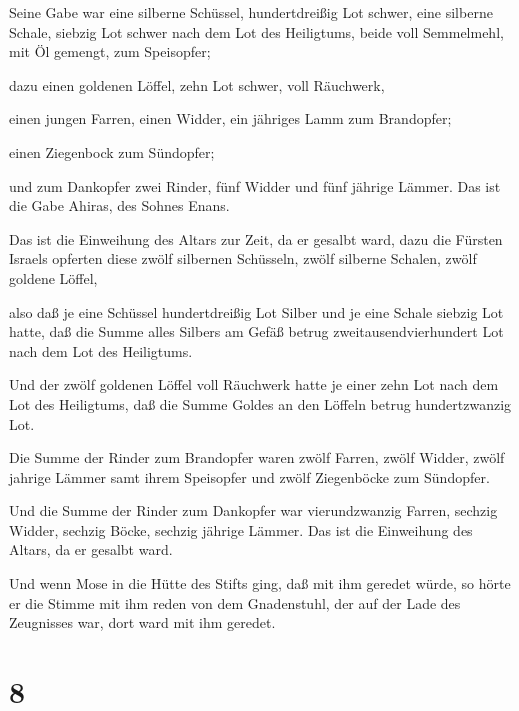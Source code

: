  Seine Gabe war eine silberne Schüssel, hundertdreißig Lot
schwer, eine silberne Schale, siebzig Lot schwer nach dem Lot des
Heiligtums, beide voll Semmelmehl, mit Öl gemengt, zum Speisopfer;

 dazu einen goldenen Löffel, zehn Lot schwer, voll
Räuchwerk,

 einen jungen Farren, einen Widder, ein jähriges Lamm zum
Brandopfer;

 einen Ziegenbock zum Sündopfer;

 und zum Dankopfer zwei Rinder, fünf Widder und fünf
jährige Lämmer. Das ist die Gabe Ahiras, des Sohnes Enans.

 Das ist die Einweihung des Altars zur Zeit, da er gesalbt
ward, dazu die Fürsten Israels opferten diese zwölf silbernen Schüsseln,
zwölf silberne Schalen, zwölf goldene Löffel,

 also daß je eine Schüssel hundertdreißig Lot Silber und je
eine Schale siebzig Lot hatte, daß die Summe alles Silbers am Gefäß
betrug zweitausendvierhundert Lot nach dem Lot des Heiligtums.

 Und der zwölf goldenen Löffel voll Räuchwerk hatte je
einer zehn Lot nach dem Lot des Heiligtums, daß die Summe Goldes an den
Löffeln betrug hundertzwanzig Lot.

 Die Summe der Rinder zum Brandopfer waren zwölf Farren,
zwölf Widder, zwölf jahrige Lämmer samt ihrem Speisopfer und zwölf
Ziegenböcke zum Sündopfer.

 Und die Summe der Rinder zum Dankopfer war vierundzwanzig
Farren, sechzig Widder, sechzig Böcke, sechzig jährige Lämmer. Das ist
die Einweihung des Altars, da er gesalbt ward.

 Und wenn Mose in die Hütte des Stifts ging, daß mit ihm
geredet würde, so hörte er die Stimme mit ihm reden von dem Gnadenstuhl,
der auf der Lade des Zeugnisses war, dort ward mit ihm geredet.

\hypertarget{section-7}{%
\section{8}\label{section-7}}

